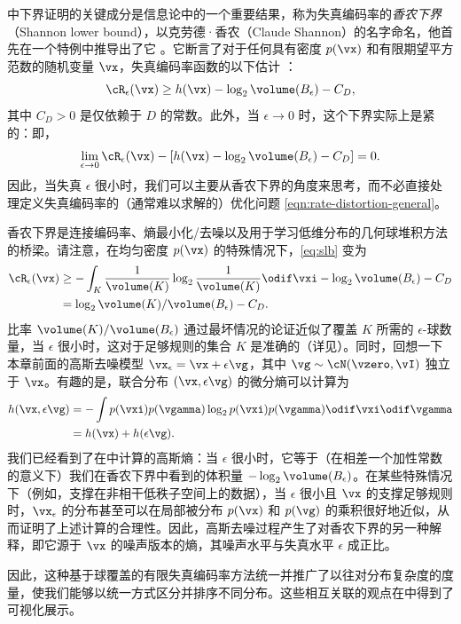 \documentclass[../../book-main_zh.tex]{subfiles}
\begin{document}
\begin{remark}\label{rem:slb}
     中下界证明的关键成分是信息论中的一个重要结果，称为失真编码率的\textit{香农下界}（Shannon lower bound），以克劳德·香农（Claude Shannon）的名字命名，他首先在一个特例中推导出了它 \cite{shannon1959coding}。它断言了对于任何具有密度 $p(\vx)$ 和有限期望平方范数的随机变量 $\vx$，失真编码率函数的以下估计 \cite{Linder1994-ej}：
    \begin{equation}\label{eq:slb}
        \cR_{\epsilon}(\vx)
        \geq
        h(\vx)
        - \log_2 \volume(B_{\epsilon})
        -
        C_D,
    \end{equation}
    其中 $C_D > 0$ 是仅依赖于 $D$ 的常数。此外，当 $\epsilon \to 0$ 时，这个下界实际上是紧的：即，
    \begin{equation}
        \lim_{\epsilon \to 0} \cR_{\epsilon}(\vx) - \left[ h(\vx) - \log_2
        \volume(B_{\epsilon}) - C_D\right] = 0.
    \end{equation}
    因此，当失真 $\epsilon$ 很小时，我们可以主要从香农下界的角度来思考，而不必直接处理定义失真编码率的（通常难以求解的）优化问题 \eqref{eqn:rate-distortion-general}。

    香农下界是连接编码率、熵最小化/去噪以及用于学习低维分布的几何球堆积方法的桥梁。请注意，在均匀密度 $p(\vx)$ 的特殊情况下，\eqref{eq:slb} 变为
    \begin{align}
        \cR_{\epsilon}(\vx) &\geq -\int_K \frac{1}{\volume(K)} \log_2
        \frac{1}{\volume(K)} \odif \vxi
        - \log_2 \volume(B_{\epsilon}) - C_D
        \\
        &=
        \log_2 \volume(K) / \volume(B_{\epsilon})
        - C_D. \label{eq:shannon-lower-bound-uniform}
    \end{align}
    比率 $\volume(K) / \volume(B_{\epsilon})$ 通过最坏情况的论证近似了覆盖 $K$ 所需的 $\epsilon$-球数量，当 $\epsilon$ 很小时，这对于足够规则的集合 $K$ 是准确的（详见）。同时，回想一下本章前面的高斯去噪模型 $\vx_{\epsilon} = \vx + \epsilon \vg$，其中 $\vg \sim \cN(\vzero, \vI)$ 独立于 $\vx$。有趣的是，联合分布 $(\vx, \epsilon\vg)$ 的微分熵可以计算为
    \begin{align}
        h(\vx, \epsilon\vg)
        &=
        -\int
        p(\vxi) p(\vgamma) \log_2 p(\vxi) p(\vgamma) \odif \vxi \odif \vgamma
        \\
        &=
        h(\vx) + h(\epsilon \vg).
    \end{align}
    我们已经看到了在中计算的高斯熵：当 $\epsilon$ 很小时，它等于（在相差一个加性常数的意义下）我们在香农下界中看到的体积量 $-\log_2 \volume(B_{\epsilon})$。在某些特殊情况下（例如，支撑在非相干低秩子空间上的数据），当 $\epsilon$ 很小且 $\vx$ 的支撑足够规则时，$\vx_{\epsilon}$ 的分布甚至可以在局部被分布 $p(\vx)$ 和 $p(\vg)$ 的乘积很好地近似，从而证明了上述计算的合理性。因此，高斯去噪过程产生了对香农下界的另一种解释，即它源于 $\vx$ 的噪声版本的熵，其噪声水平与失真水平 $\epsilon$ 成正比。

    因此，这种基于球覆盖的有限失真编码率方法统一并推广了以往对分布复杂度的度量，使我们能够以统一方式区分并排序不同分布。这些相互关联的观点在中得到了可视化展示。
\end{remark}
\end{document}
